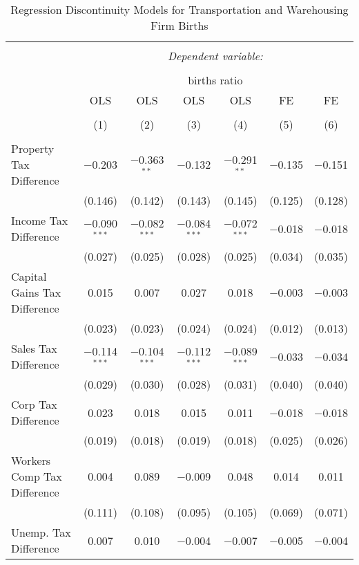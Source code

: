 
\begin{table}[!htbp] \centering 
  \caption{Regression Discontinuity Models for  Transportation and Warehousing Firm Births} 
  \label{48-49rd} 
\begin{tabular}{@{\extracolsep{5pt}}lcccccc} 
\\[-1.8ex]\hline 
\hline \\[-1.8ex] 
 & \multicolumn{6}{c}{\textit{Dependent variable:}} \\ 
\cline{2-7} 
\\[-1.8ex] & \multicolumn{6}{c}{births ratio} \\ 
 & OLS & OLS & OLS & OLS & FE & FE \\ 
\\[-1.8ex] & (1) & (2) & (3) & (4) & (5) & (6)\\ 
\hline \\[-1.8ex] 
 Property Tax Difference & $-$0.203 & $-$0.363$^{**}$ & $-$0.132 & $-$0.291$^{**}$ & $-$0.135 & $-$0.151 \\ 
  & (0.146) & (0.142) & (0.143) & (0.145) & (0.125) & (0.128) \\ 
  Income Tax Difference & $-$0.090$^{***}$ & $-$0.082$^{***}$ & $-$0.084$^{***}$ & $-$0.072$^{***}$ & $-$0.018 & $-$0.018 \\ 
  & (0.027) & (0.025) & (0.028) & (0.025) & (0.034) & (0.035) \\ 
  Capital Gains Tax Difference & 0.015 & 0.007 & 0.027 & 0.018 & $-$0.003 & $-$0.003 \\ 
  & (0.023) & (0.023) & (0.024) & (0.024) & (0.012) & (0.013) \\ 
  Sales Tax Difference & $-$0.114$^{***}$ & $-$0.104$^{***}$ & $-$0.112$^{***}$ & $-$0.089$^{***}$ & $-$0.033 & $-$0.034 \\ 
  & (0.029) & (0.030) & (0.028) & (0.031) & (0.040) & (0.040) \\ 
  Corp Tax Difference & 0.023 & 0.018 & 0.015 & 0.011 & $-$0.018 & $-$0.018 \\ 
  & (0.019) & (0.018) & (0.019) & (0.018) & (0.025) & (0.026) \\ 
  Workers Comp Tax Difference & 0.004 & 0.089 & $-$0.009 & 0.048 & 0.014 & 0.011 \\ 
  & (0.111) & (0.108) & (0.095) & (0.105) & (0.069) & (0.071) \\ 
  Unemp. Tax Difference & 0.007 & 0.010 & $-$0.004 & $-$0.007 & $-$0.005 & $-$0.004 \\ 

\end{tabular}
\end{table}
